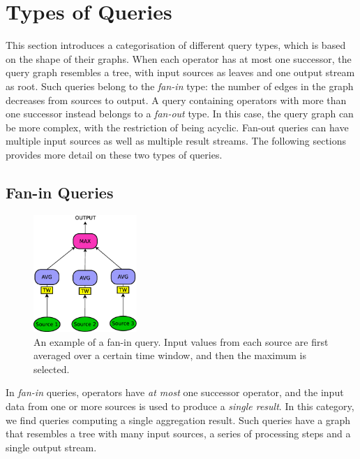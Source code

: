 \section{Types of Queries}
\label{sec:qtypes}



This section introduces a categorisation of different query types, which is
based on the shape of their graphs. When each operator has at most one successor, the query
graph resembles a tree, with input sources as leaves and one output stream as root. Such queries
belong to the \emph{fan-in} type: the number of edges in the graph decreases from sources
to output. 
A query containing operators with more than one successor instead belongs to a \emph{fan-out} type. 
In this case, the query graph can be more complex, with the restriction of being acyclic. Fan-out
queries can have multiple input sources as well as multiple result streams. 
The following sections provides more detail on these two types of queries.

\subsection*{Fan-in Queries}
\label{sec:fan-in}

\begin{figure}[t]
	\centering
	\includegraphics[width=0.35\textwidth]{img/tesi/query_fanin_senza} 
	\caption{An example of a fan-in query. Input values from each source are first averaged over a certain
	time window, and then the maximum is selected.}
	\label{fig:query_fanin}
\end{figure}


In \emph{fan-in} queries, operators have \textit{at most} one successor operator, and the input data from
one or more sources is used to produce a \textit{single result}.
In this category, we find queries computing a single aggregation result.
Such queries have a graph that resembles a tree with many input sources, a series of
processing steps and a single output stream.

